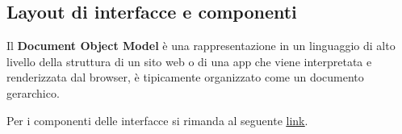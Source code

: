 \subsection*{Layout di interfacce e componenti}
Il \textbf{Document Object Model} è una rappresentazione in un linguaggio di alto livello della struttura di un sito web o di una app che viene
interpretata e renderizzata dal browser, \`e tipicamente organizzato come un documento gerarchico.

Per i componenti delle interfacce si rimanda al seguente
\href{https://www.usability.gov/how-to-and-tools/methods/user-interface-elements.html}{\underline{link}}.